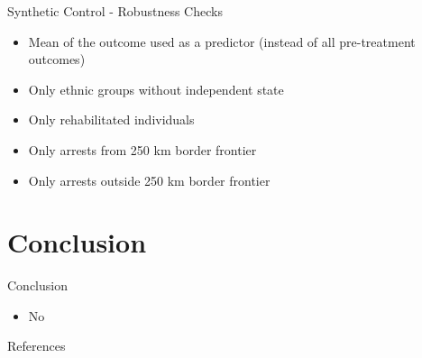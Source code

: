 \documentclass[11pt]{beamer}
\begin{document}
\begin{frame}[label=sc_robustness_checks]{Synthetic Control - Robustness Checks}
 \begin{itemize}
    \item Mean of the outcome used as a predictor (instead of all pre-treatment outcomes) \hyperlink{sc_mean}{}
        \item Only ethnic groups without independent state \hyperlink{sc_without_ind_state}{}
        \item Only rehabilitated individuals \hyperlink{sc_rehabs}{}
        \item Only arrests from 250 km border frontier \hyperlink{sc_border_area}{}
        \item Only arrests outside 250 km border frontier \hyperlink{sc_non_border_area}{}
    \end{itemize}
\end{frame}




\section{Conclusion}

\begin{frame}{Conclusion}
\begin{itemize}
    \item No
\end{itemize}

\end{frame}

\begin{frame}[allowframebreaks]{References}
\printbibliography
\end{frame}
\end{document}
